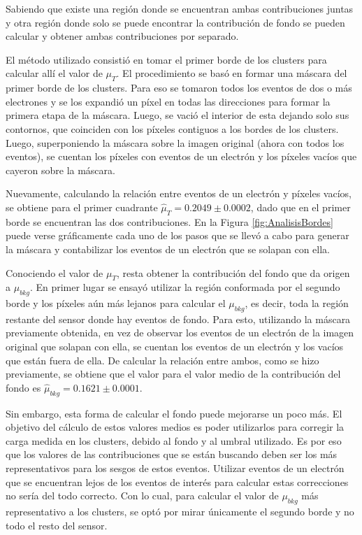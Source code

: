 Sabiendo que existe una región donde se encuentran ambas contribuciones juntas y otra región donde solo se puede encontrar la contribución de fondo se pueden calcular y obtener ambas contribuciones por separado.

El método utilizado consistió en tomar el primer borde de los clusters para calcular allí el valor de $\mu_{T}$. El procedimiento se basó en formar una máscara del primer borde de los clusters. Para eso se tomaron todos los eventos de dos o más electrones y se los expandió un píxel en todas las direcciones para formar la primera etapa de la máscara. Luego, se vació el interior de esta dejando solo sus contornos, que coinciden con los píxeles contiguos a los bordes de los clusters. Luego, superponiendo la máscara sobre la imagen original (ahora con todos los eventos), se cuentan los píxeles con eventos de un electrón y los píxeles vacíos que cayeron sobre la máscara. 

Nuevamente, calculando la relación entre eventos de un electrón y píxeles vacíos, se obtiene para el primer cuadrante $\hat{\mu}_{T} = 0.2049 \pm 0.0002$, dado que en el primer borde se encuentran las dos contribuciones. En la Figura \ref{fig:AnalisisBordes} puede verse gráficamente cada uno de los pasos que se llevó a cabo para generar la máscara y contabilizar los eventos de un electrón que se solapan con ella.

Conociendo el valor de $\mu_{T}$, resta obtener la contribución del fondo que da origen a $\mu_{bkg}$. En primer lugar se ensayó utilizar la región conformada por el segundo borde y los píxeles aún más lejanos para calcular el $\mu_{bkg}$, es decir, toda la región restante del sensor donde hay eventos de fondo. Para esto, utilizando la máscara previamente obtenida, en vez de observar los eventos de un electrón de la imagen original que solapan con ella, se cuentan los eventos de un electrón y los vacíos que están fuera de ella. De calcular la relación entre ambos, como se hizo previamente, se obtiene que el valor para el valor medio de la contribución del fondo es $\hat{\mu}_{bkg} = 0.1621 \pm 0.0001$. 

Sin embargo, esta forma de calcular el fondo puede mejorarse un poco más. El objetivo del cálculo de estos valores medios es poder utilizarlos para corregir la carga medida en los clusters, debido al fondo y al umbral utilizado. Es por eso que los valores de las contribuciones que se están buscando deben ser los más representativos para los sesgos de estos eventos. Utilizar eventos de un electrón que se encuentran lejos de los eventos de interés para calcular estas correcciones no sería del todo correcto. Con lo cual, para calcular el valor de $\mu_{bkg}$ más representativo a los clusters, se optó por mirar únicamente el segundo borde y no todo el resto del sensor.

